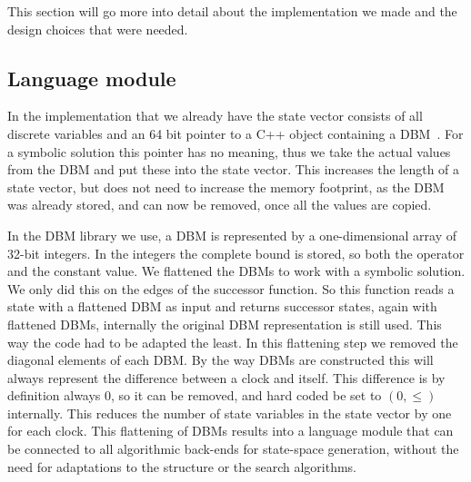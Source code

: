 This section will go more into detail about the implementation we made and the design choices that were needed. 

\subsection{Language module}
In the \ltsmin{} implementation that we already have the state vector consists of all discrete variables and an 64 bit pointer to a C++ object containing a DBM~\cite{eemcs21972}. For a symbolic solution this pointer has no meaning, thus we take the actual values from the DBM and put these into the state vector. This increases the length of a state vector, but does not need to increase the memory footprint, as the DBM was already stored, and can now be removed, once all the values are copied.
 
In the DBM library we use, a DBM is represented by a one-dimensional array of 32-bit integers. In the integers the complete bound is stored, so both the operator and the constant value. We flattened the DBMs to work with a symbolic solution. We only did this on the edges of the successor function. So this function reads a state with a flattened DBM as input and returns successor states, again with flattened DBMs, internally the original DBM representation is still used. This way the code had to be adapted the least. In this flattening step we removed the diagonal elements of each DBM. By the way DBMs are constructed this will always represent the difference between a clock and itself. This difference is by definition always 0, so it can be removed, and hard coded be set to $(0,\leq)$ internally. This reduces the number of state variables in the state vector by one for each clock. This flattening of DBMs results into a language module that can be connected to all \ltsmin{} algorithmic back-ends for state-space generation, without the need for adaptations to the structure or the search algorithms. 

